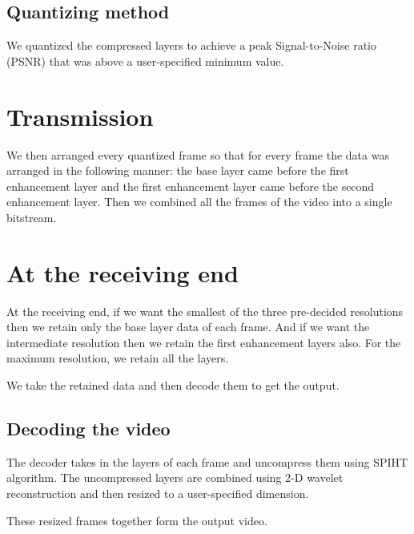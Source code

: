 \documentclass[10pt,twocolumn]{article}
\begin{document}
\subsection*{Quantizing method}

We quantized the compressed layers to achieve a peak Signal-to-Noise ratio (PSNR) that was above a user-specified minimum value.

\section{Transmission}

We then arranged every quantized frame so that for every frame the data was arranged in the following manner: the base layer came before the first enhancement layer and the first enhancement layer came before the second enhancement layer. Then we combined all the frames of the video into a single bitstream.

\section{At the receiving end}

At the receiving end, if we want the smallest of the three pre-decided resolutions then we retain only the base layer data of each frame. And if we want the intermediate resolution then we retain the first enhancement layers also. For the maximum resolution, we retain all the layers.

We take the retained data and then decode them to get the output.

\subsection*{Decoding the video}

The decoder takes in the layers of each frame and uncompress them using SPIHT\cite{amirSaid1996} algorithm. The uncompressed layers are combined using 2-D wavelet reconstruction and then resized to a user-specified dimension.

These resized frames together form the output video.




\end{document}
